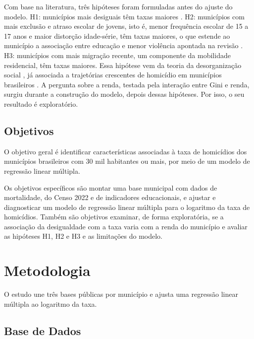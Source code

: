 \documentclass[a4paper,11pt]{article}
\begin{document}
Com base na literatura, três hipóteses foram formuladas antes do ajuste do modelo. H1: municípios mais desiguais têm taxas maiores \citep{fajnzylber2002, kelly2000, wanzinack2022}. H2: municípios com mais exclusão e atraso escolar de jovens, isto é, menor frequência escolar de 15 a 17 anos e maior distorção idade-série, têm taxas maiores, o que estende ao município a associação entre educação e menor violência apontada na revisão \citep{wanzinack2018}. H3: municípios com mais migração recente, um componente da mobilidade residencial, têm taxas maiores. Essa hipótese vem da teoria da desorganização social \citep{sampson1989}, já associada a trajetórias crescentes de homicídio em municípios brasileiros \citep{peres2017}. A pergunta sobre a renda, testada pela interação entre Gini e renda, surgiu durante a construção do modelo, depois dessas hipóteses. Por isso, o seu resultado é exploratório.

\subsection{Objetivos}

O objetivo geral é identificar características associadas à taxa de homicídios dos municípios brasileiros com 30 mil habitantes ou mais, por meio de um modelo de regressão linear múltipla.

Os objetivos específicos são montar uma base municipal com dados de mortalidade, do Censo 2022 e de indicadores educacionais, e ajustar e diagnosticar um modelo de regressão linear múltipla para o logaritmo da taxa de homicídios. Também são objetivos examinar, de forma exploratória, se a associação da desigualdade com a taxa varia com a renda do município e avaliar as hipóteses H1, H2 e H3 e as limitações do modelo.

\section{Metodologia}

O estudo une três bases públicas por município e ajusta uma regressão linear múltipla ao logaritmo da taxa.

\subsection{Base de Dados}
\label{sec:dados}
\end{document}
